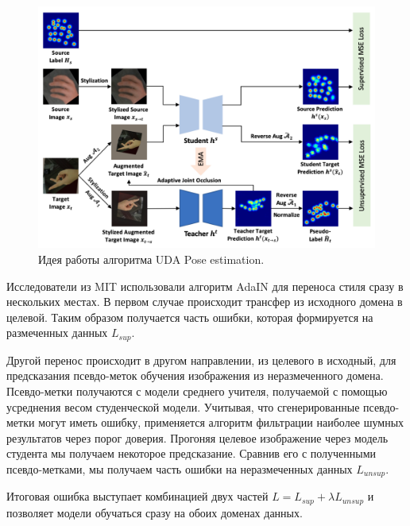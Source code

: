 \begin{figure}[h]
	\centering
	\includegraphics[width=\textwidth]{./images/UDA}
	\caption{Идея работы алгоритма UDA Pose estimation. \cite{uda}}
	\label{fig:uda}
\end{figure}

Исследователи из MIT использовали алгоритм AdaIN \cite{adain} для переноса стиля сразу в нескольких местах. В первом случае происходит трансфер из исходного домена в целевой. Таким образом получается часть ошибки, которая формируется на размеченных данных $L_{sup}$.

Другой перенос происходит в другом направлении, из целевого в исходный, для предсказания псевдо-меток обучения изображения из неразмеченного домена. Псевдо-метки получаются с модели среднего учителя, получаемой с помощью усреднения весом студенческой модели. Учитывая, что сгенерированные псевдо-метки могут иметь ошибку, применяется алгоритм фильтрации наиболее шумных результатов через порог доверия. Прогоняя целевое изображение через модель студента мы получаем некоторое предсказание. Сравнив его с полученными псевдо-метками, мы получаем часть ошибки на неразмеченных данных $L_{unsup}$.

Итоговая ошибка выступает комбинацией двух частей $L = L_{sup} + \lambda L_{unsup}$ и позволяет модели обучаться сразу на обоих доменах данных.


\newpage
